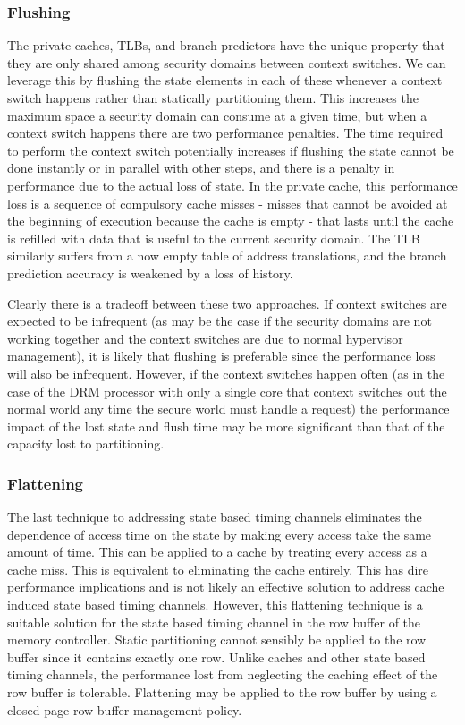 \subsubsection{Flushing}
The private caches, TLBs, and branch predictors have the unique property that 
they are only shared among security domains between context switches. We can 
leverage this by flushing the state elements in each of these whenever  a 
context switch happens rather than statically partitioning them. This increases 
the maximum space a security domain can consume at a given time, but when a 
context switch happens there are two performance penalties. The time required 
to perform the context switch potentially increases if flushing the state 
cannot be done instantly or in parallel with other steps, and there is a 
penalty in performance due to the actual loss of state. In the private cache, 
this performance loss is a sequence of compulsory cache misses - misses that 
cannot be avoided at the beginning of execution because the cache is empty - 
that lasts until the cache is refilled with data that is useful to the current 
security domain. The TLB similarly suffers from a now empty table of address 
translations, and the branch prediction accuracy is weakened by a loss of 
history. 

Clearly there is a tradeoff between these two approaches. If context switches 
are expected to be infrequent (as may be the case if the security domains are 
not working together and the context switches are due to normal hypervisor 
management), it is likely that flushing is preferable since the performance 
loss will also be infrequent. However, if the context switches happen often (as 
in the case of the DRM processor with only a single core that context switches 
out the normal world any time the secure world must handle a request) the 
performance impact of the lost state and flush time may be more significant 
than that of the capacity lost to partitioning.

\subsubsection{Flattening}
The last technique to addressing state based timing channels eliminates the 
dependence of access time on the state by making every access take the same 
amount of time. This can be applied to a cache by treating every access as a 
cache miss. This is equivalent to eliminating the cache entirely. This has dire 
performance implications and is not likely an effective solution to address 
cache induced state based timing channels. However, this flattening technique 
is a suitable solution for the state based timing channel in the row buffer of 
the memory controller. Static partitioning cannot sensibly be applied to the 
row buffer since it contains exactly one row. Unlike caches and other state 
based timing channels, the performance lost from neglecting the caching effect 
of the row buffer is tolerable. Flattening may be applied to the row buffer by 
using a closed page row buffer management policy.

